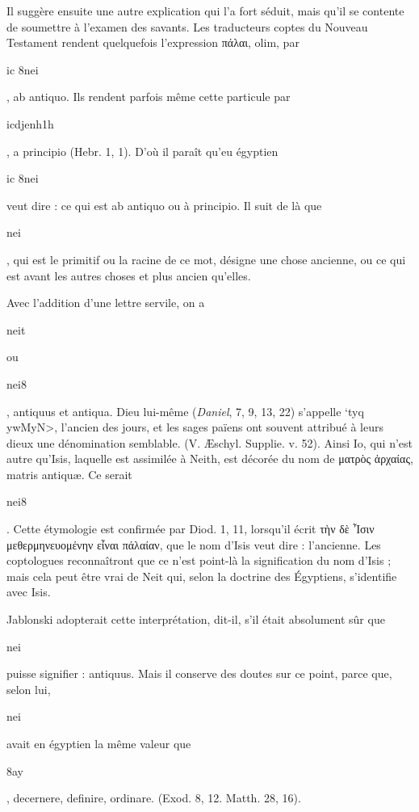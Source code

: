 \documentclass[letterpaper,twocolumn,openany,nodeprecatedcode]{dndbook}
\begin{document}
Il suggère ensuite une autre explication qui l'a fort séduit, mais qu'il se contente de soumettre à l'examen des savants. Les traducteurs coptes du Nouveau Testament rendent quelquefois l'expression πάλαι, olim, par \begin{coptic}ic 8nei\end{coptic}, ab antiquo. Ils rendent parfois même cette particule par \begin{coptic}icdjenh1h\end{coptic}, a principio (Hebr. 1, 1). D'où il paraît qu'eu égyptien \begin{coptic}ic 8nei\end{coptic} veut dire : ce qui est ab antiquo ou à principio. Il suit de là que \begin{coptic}nei\end{coptic}, qui est le primitif ou la racine de ce mot, désigne une chose ancienne, ou ce qui est avant les autres choses et plus ancien qu'elles.

Avec l'addition d'une lettre servile, on a \begin{coptic}neit\end{coptic} ou \begin{coptic}nei8\end{coptic}, antiquus et antiqua. Dieu lui-même (\emph{Daniel}, 7, 9, 13, 22) s'appelle \foreignlanguage{hebrew}{\<`tyq ywMyN>}, l'ancien des jours, et les sages païens ont souvent attribué à leurs dieux une dénomination semblable. (V. Æschyl. Supplie. v. 52). Ainsi Io, qui n'est autre qu'Isis, laquelle est assimilée à Neith, est décorée du nom de ματρὸς ἀρχαίας, matris antiquæ. Ce serait \begin{coptic}nei8\end{coptic}. Cette étymologie est confirmée par Diod. 1, 11, lorsqu'il écrit τὴν δὲ Ἶσιν μεθερμηνευομένην εἶναι πάλαίαν, que le nom d'Isis veut dire : l'ancienne. Les coptologues reconnaîtront que ce n'est point-là la signification du nom d'Isis ; mais cela peut être vrai de Neit qui, selon la doctrine des Égyptiens, s'identifie avec Isis.

Jablonski adopterait cette interprétation, dit-il, s'il était absolument sûr que \begin{coptic}nei\end{coptic} puisse signifier : antiquus. Mais il conserve des doutes sur ce point, parce que, selon lui, \begin{coptic}nei\end{coptic} avait en égyptien la même valeur que \begin{coptic}8ay\end{coptic}, decernere, definire, ordinare. (Exod. 8, 12. Matth. 28, 16).
\end{document}
